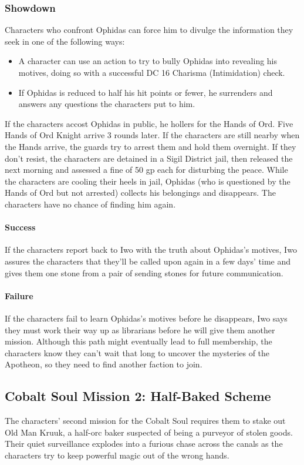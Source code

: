 \documentclass[10pt,a4paper,twoside,bg=print,twocolumn,openany,nodeprecatedcode]{dndbook}
\begin{document}
\subsubsection{Showdown}
Characters who confront Ophidas can force him to divulge the information they seek in one of the following ways:


\begin{itemize}
\item A character can use an action to try to bully Ophidas into revealing his motives, doing so with a successful DC 16 Charisma (Intimidation) check.
\item If Ophidas is reduced to half his hit points or fewer, he surrenders and answers any questions the characters put to him.
\end{itemize}

If the characters accost Ophidas in public, he hollers for the Hands of Ord. Five Hands of Ord Knight arrive 3 rounds later. If the characters are still nearby when the Hands arrive, the guards try to arrest them and hold them overnight. If they don't resist, the characters are detained in a Sigil District jail, then released the next morning and assessed a fine of 50 gp each for disturbing the peace. While the characters are cooling their heels in jail, Ophidas (who is questioned by the Hands of Ord but not arrested) collects his belongings and disappears. The characters have no chance of finding him again.

\paragraph{Success}
If the characters report back to Iwo with the truth about Ophidas's motives, Iwo assures the characters that they'll be called upon again in a few days' time and gives them one stone from a pair of sending stones for future communication.

\paragraph{Failure}
If the characters fail to learn Ophidas's motives before he disappears, Iwo says they must work their way up as librarians before he will give them another mission. Although this path might eventually lead to full membership, the characters know they can't wait that long to uncover the mysteries of the Apotheon, so they need to find another faction to join.

\subsection{Cobalt Soul Mission 2: Half-Baked Scheme}
The characters' second mission for the Cobalt Soul requires them to stake out Old Man Kruuk, a half-orc baker suspected of being a purveyor of stolen goods. Their quiet surveillance explodes into a furious chase across the canals as the characters try to keep powerful magic out of the wrong hands.
\end{document}
